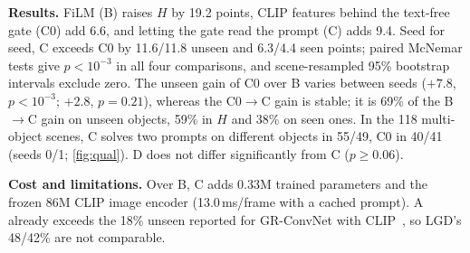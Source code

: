 \textbf{Results.} FiLM (B) raises $H$ by 19.2 points, CLIP features behind the text-free gate (C0) add 6.6, and letting the gate read the prompt (C) adds 9.4. Seed for seed, C exceeds C0 by 11.6/11.8 unseen and 6.3/4.4 seen points; paired McNemar tests give $p<10^{-3}$ in all four comparisons, and scene-resampled 95\% bootstrap intervals exclude zero. The unseen gain of C0 over B varies between seeds ($+7.8$, $p<10^{-3}$; $+2.8$, $p=0.21$), whereas the C0$\to$C gain is stable; it is 69\% of the B$\to$C gain on unseen objects, 59\% in $H$ and 38\% on seen ones. In the 118 multi-object scenes, C solves two prompts on different objects in 55/49, C0 in 40/41 (seeds 0/1; \cref{fig:qual}). D does not differ significantly from C ($p\geq0.06$).

\textbf{Cost and limitations.} Over B, C adds 0.33M trained parameters and the frozen 86M CLIP image encoder (13.0\,ms/frame with a cached prompt). A already exceeds the 18\% unseen reported for GR-ConvNet with CLIP~\cite{vuong2024language}, so LGD's 48/42\% are not comparable.
